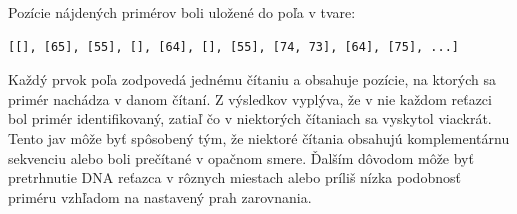 Pozície nájdených primérov boli uložené do poľa v tvare:
\begin{verbatim}
[[], [65], [55], [], [64], [], [55], [74, 73], [64], [75], ...]
\end{verbatim}

Každý prvok poľa zodpovedá jednému čítaniu a obsahuje pozície, na ktorých sa primér nachádza v danom čítaní. Z výsledkov vyplýva, že v nie každom reťazci bol primér identifikovaný, zatiaľ čo v niektorých čítaniach sa vyskytol viackrát.
Tento jav môže byť spôsobený tým, že niektoré čítania obsahujú komplementárnu sekvenciu alebo boli prečítané v opačnom smere. Ďalším dôvodom môže byť pretrhnutie DNA reťazca v rôznych miestach alebo príliš nízka podobnosť priméru vzhľadom na nastavený prah zarovnania.
